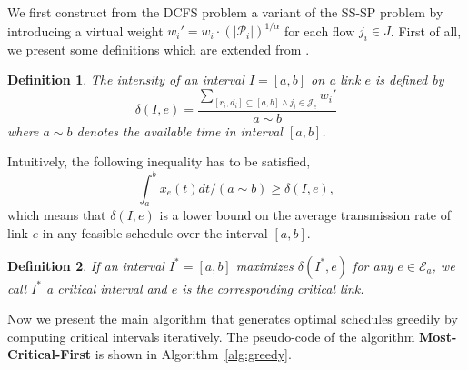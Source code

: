 \documentclass[10pt, conference, compsocconf]{IEEEtran}
\newtheorem{definition}{Definition}
\begin{document}
We first construct from the DCFS problem a variant of the SS-SP problem by introducing a virtual weight $w_i' = w_i \cdot (|\mathcal{P}_i|)^{1/\alpha}$ for each flow $j_i \in J$. First of all, we present some definitions which are extended from \cite{Yao_Demers_Shenker-YDS-1995}.
\begin{definition}
The intensity of an interval $I = [a,b]$ on a link $e$ is defined by
\begin{equation}
\delta(I,e) = \frac{\sum_{[r_i,d_i]\subseteq [a,b] \wedge j_i \in \mathcal{J}_e}w_i'}{a\sim b} 
\end{equation}
where $a \sim b$ denotes the available time in interval $[a,b]$.
\end{definition}
Intuitively, the following inequality has to be satisfied,
\begin{equation}
\int_{a}^{b} x_e(t) dt/(a \sim b) \geq \delta(I,e), 
\end{equation}
which means that $\delta(I,e)$ is a lower bound on the average transmission rate of link $e$ in any feasible schedule over the interval $[a,b]$.
\begin{definition}
If an interval $I^*=[a,b]$ maximizes $\delta(I^*,e)$ for any $e \in \mathcal{E}_a$, we call $I^*$ a critical interval and $e$ is the corresponding critical link.
\end{definition}
Now we present the main algorithm that generates optimal schedules greedily by computing critical intervals iteratively. The pseudo-code of the algorithm \textbf{Most-Critical-First} is shown in Algorithm~\ref{alg:greedy}.
\end{document}
